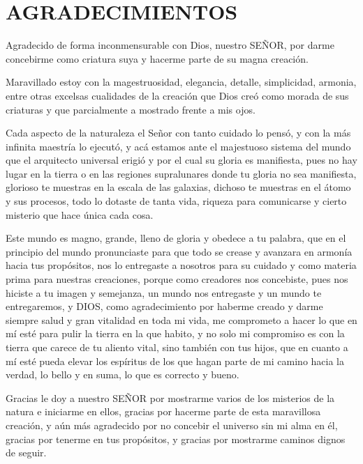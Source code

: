 \section{AGRADECIMIENTOS}

Agradecido de forma inconmensurable con Dios, nuestro SEÑOR, 
por darme concebirme como criatura suya y hacerme parte de su magna creación. 

Maravillado estoy con la magestruosidad, elegancia, detalle, simplicidad, 
armonia, entre otras excelsas cualidades de la creación que Dios creó como morada de sus criaturas y que parcialmente a mostrado frente a mis ojos.


Cada aspecto de la naturaleza el Señor con tanto cuidado lo pensó, y 
con la más infinita maestría lo ejecutó, y acá estamos ante el majestuoso 
sistema del mundo que el arquitecto universal erigió y por el cual su gloria 
es manifiesta, pues no hay lugar en la tierra o en las regiones supralunares 
donde tu gloria no sea manifiesta, glorioso te muestras en la escala de las galaxias, dichoso te muestras en el átomo y sus procesos, todo lo dotaste de tanta vida, riqueza para comunicarse y cierto misterio que hace única cada cosa. 

Este mundo es magno, grande, lleno de gloria y obedece a tu palabra, que en 
el principio del mundo pronunciaste para que todo se crease y avanzara en armonía hacia tus propósitos, nos lo entregaste a nosotros para su cuidado y como materia prima para nuestras creaciones, porque como creadores nos concebiste, pues nos hiciste a tu imagen y semejanza, un mundo nos entregaste y un mundo te entregaremos, y DIOS, como agradecimiento por haberme creado y darme siempre salud y gran vitalidad en toda mi vida, me comprometo a hacer lo que en mí esté para pulir la tierra en la que habito, y no solo mi compromiso es con la tierra que carece de tu aliento vital, sino también con tus hijos, que en cuanto a mí esté pueda elevar los espíritus de los que hagan parte de mi camino hacia la verdad, lo bello y en suma, lo que es correcto y bueno.

Gracias le doy a nuestro SEÑOR por mostrarme varios de los misterios de la natura e iniciarme en ellos, gracias por hacerme parte de esta maravillosa creación, y aún más agradecido por no concebir el universo sin mi alma en él, gracias por tenerme en tus propósitos, y gracias por mostrarme caminos dignos de seguir.


